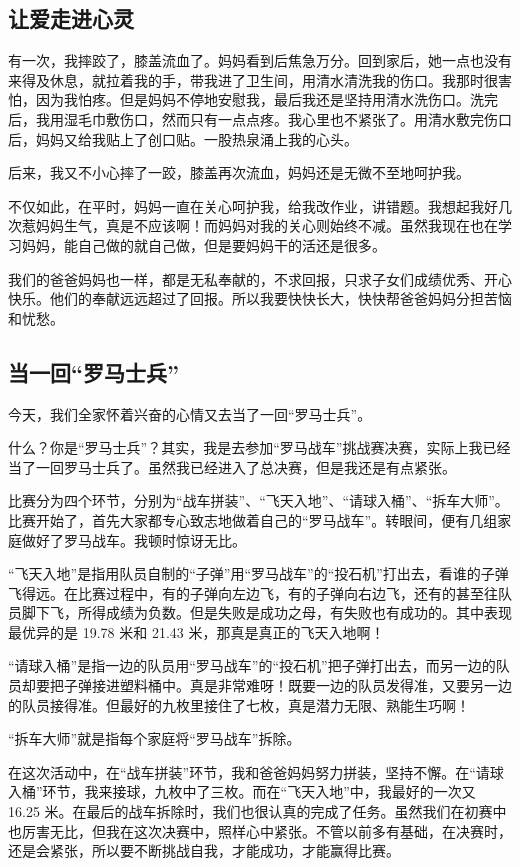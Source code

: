 \documentclass[UTF8,a4paper,titlepage,twoside,10.5pt]{article}
\begin{document}
\subsection{让爱走进心灵}
\label{sec:org85154a0}

有一次，我摔跤了，膝盖流血了。妈妈看到后焦急万分。回到家后，她一点也没有来得及休息，就拉着我的手，带我进了卫生间，用清水清洗我的伤口。我那时很害怕，因为我怕疼。但是妈妈不停地安慰我，最后我还是坚持用清水洗伤口。洗完后，我用湿毛巾敷伤口，然而只有一点点疼。我心里也不紧张了。用清水敷完伤口后，妈妈又给我贴上了创口贴。一股热泉涌上我的心头。

后来，我又不小心摔了一跤，膝盖再次流血，妈妈还是无微不至地呵护我。

不仅如此，在平时，妈妈一直在关心呵护我，给我改作业，讲错题。我想起我好几次惹妈妈生气，真是不应该啊！而妈妈对我的关心则始终不减。虽然我现在也在学习妈妈，能自己做的就自己做，但是要妈妈干的活还是很多。

我们的爸爸妈妈也一样，都是无私奉献的，不求回报，只求子女们成绩优秀、开心快乐。他们的奉献远远超过了回报。所以我要快快长大，快快帮爸爸妈妈分担苦恼和忧愁。

\subsection{当一回“罗马士兵”}
\label{sec:org526064d}

今天，我们全家怀着兴奋的心情又去当了一回“罗马士兵”。

什么？你是“罗马士兵”？其实，我是去参加“罗马战车”挑战赛决赛，实际上我已经当了一回罗马士兵了。虽然我已经进入了总决赛，但是我还是有点紧张。

比赛分为四个环节，分别为“战车拼装”、“飞天入地”、“请球入桶”、“拆车大师”。比赛开始了，首先大家都专心致志地做着自己的“罗马战车”。转眼间，便有几组家庭做好了罗马战车。我顿时惊讶无比。

“飞天入地”是指用队员自制的“子弹”用“罗马战车”的“投石机”打出去，看谁的子弹飞得远。在比赛过程中，有的子弹向左边飞，有的子弹向右边飞，还有的甚至往队员脚下飞，所得成绩为负数。但是失败是成功之母，有失败也有成功的。其中表现最优异的是 19.78 米和 21.43 米，那真是真正的飞天入地啊！

“请球入桶”是指一边的队员用“罗马战车”的“投石机”把子弹打出去，而另一边的队员却要把子弹接进塑料桶中。真是非常难呀！既要一边的队员发得准，又要另一边的队员接得准。但最好的九枚里接住了七枚，真是潜力无限、熟能生巧啊！

“拆车大师”就是指每个家庭将“罗马战车”拆除。

在这次活动中，在“战车拼装”环节，我和爸爸妈妈努力拼装，坚持不懈。在“请球入桶”环节，我来接球，九枚中了三枚。而在“飞天入地”中，我最好的一次又 16.25 米。在最后的战车拆除时，我们也很认真的完成了任务。虽然我们在初赛中也厉害无比，但我在这次决赛中，照样心中紧张。不管以前多有基础，在决赛时，还是会紧张，所以要不断挑战自我，才能成功，才能赢得比赛。
\end{document}
